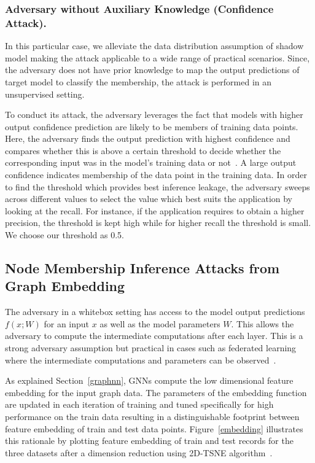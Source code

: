 \subsubsection{Adversary without Auxiliary Knowledge (Confidence Attack).} In this particular case, we alleviate the data distribution assumption of shadow model making the attack applicable to a wide range of practical scenarios.
Since, the adversary does not have prior knowledge to map the output predictions of target model to classify the membership, the attack is performed in an unsupervised setting.%

To conduct its attack, the adversary leverages the fact that models with higher output confidence prediction are likely to be members of training data points.
Here, the adversary finds the output prediction with highest confidence and compares whether this is above a certain threshold to decide whether the corresponding input was in the model's training data or not~\cite{8429311,ndss19salem,10.1145/3319535.3354211}.
A large output confidence indicates membership of the data point in the training data.
In order to find the threshold which provides best inference leakage, the adversary sweeps across different values to select the value which best suits the application by looking at the recall.
For instance, if the application requires to obtain a higher precision, the threshold is kept high while for higher recall the threshold is small. We choose our threshold as 0.5.







\subsection{Node Membership Inference Attacks from Graph Embedding}

The adversary in a whitebox setting has access to the model output predictions $f(x; W)$ for an input $x$ as well as the model parameters $W$.
This allows the adversary to compute the intermediate computations after each layer.
This is a strong adversary assumption but practical in cases such as federated learning where the intermediate computations and parameters can be observed~\cite{8835245,DBLP:conf/sp/MelisSCS19}.

As explained Section~\ref{graphnn}, GNNs compute the low dimensional feature embedding for the input graph data.
The parameters of the embedding function are updated in each iteration of training and tuned specifically for high performance on the train data resulting in a distinguishable footprint between feature embedding of train and test data points.
Figure~\ref{embedding} illustrates this rationale by plotting feature embedding of train and test records for the three datasets after a dimension reduction using 2D-TSNE algorithm~\cite{vanDerMaaten2008}.



